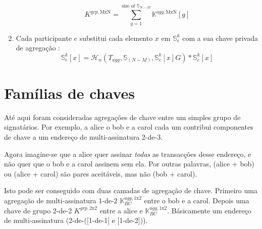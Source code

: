 \begin{enumerate}
    \[K^{grp,\textrm{MxN}} = \sum^{\textrm{size of }\mathbb{S}_{N-M}}_{g = 1} \mathbb{K}^{agg,\textrm{MxN}}[g]\]
    \item Cada participante $e$ substitui cada elemento $x$ em $\mathbb{S}^k_{e}$ com a sua chave privada de agregação : \vspace{.175cm}
    \[ \mathbb{S}^k_{e}[x] = \mathcal{H}_n(T_{agg},\mathbb{S}_{(N-M)},\mathbb{S}^k_{e}[x] G)*\mathbb{S}^k_{e}[x] \]
\end{enumerate}



\section{Famílias de chaves}
\label{sec:general-key-families}

Até aqui foram consideradas agregações de chave entre um simples grupo de signatários. Por exemplo, a alice o bob e a carol cada um contribui componentes de chave a um endereço de multi-assinatura 2-de-3.

Agora imagine-se que a alice quer assinar {\em todas} as transacções desse endereço, e não quer que o bob e a carol assinem sem ela. Por outras palavras, (alice + bob) ou (alice + carol) são pares aceitáveis, mas não (bob + carol). 

Isto pode ser conseguido com duas camadas de agregação de chave. Primeiro uma agregação
 de multi-assinatura 1-de-2 $\mathbb{K}^{agg,{1\textrm{x}2}}_{BC}$ entre o bob e a carol. Depois uma chave de grupo 2-de-2 $K^{grp,{2\textrm{x}2}}$ entre a alice e $\mathbb{K}^{agg,{1\textrm{x}2}}_{BC}$. Básicamente um endereço de multi-assinatura (2-de-([1-de-1] e [1-de-2])). 


